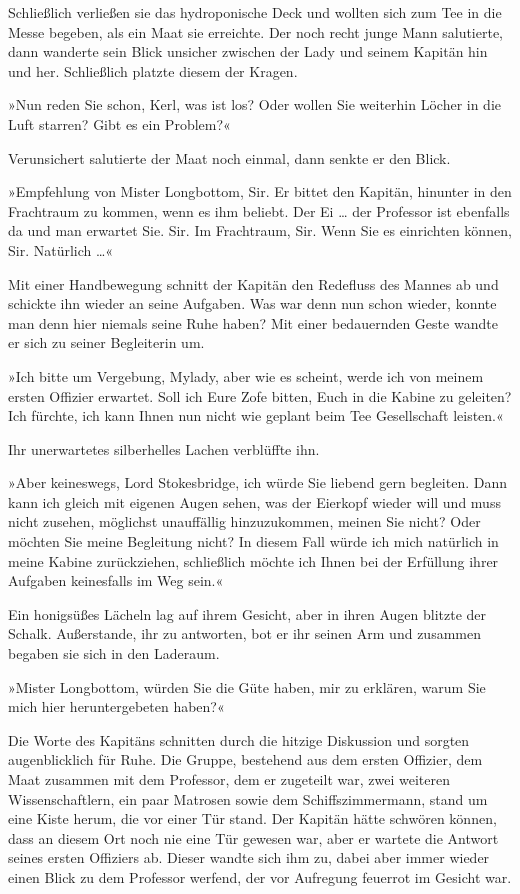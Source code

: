 \bigpar

Schließlich verließen sie das hydroponische Deck und wollten sich
zum Tee in die Messe begeben, als ein Maat sie erreichte. Der noch
recht junge Mann salutierte, dann wanderte sein Blick unsicher
zwischen der Lady und seinem Kapitän hin und her. Schließlich
platzte diesem der Kragen.

»Nun reden Sie schon, Kerl, was ist los? Oder wollen Sie weiterhin
Löcher in die Luft starren? Gibt es ein Problem?«

Verunsichert salutierte der Maat noch einmal, dann senkte er den
Blick.

»Empfehlung von Mister Longbottom, Sir. Er bittet den Kapitän,
hinunter in den Frachtraum zu kommen, wenn es ihm beliebt. Der Ei
\ldots{} der Professor ist ebenfalls da und man erwartet Sie. Sir. Im
Frachtraum, Sir. Wenn Sie es einrichten können, Sir. Natürlich
\ldots{}«

Mit einer Handbewegung schnitt der Kapitän den Redefluss des Mannes
ab und schickte ihn wieder an seine Aufgaben. Was war denn nun
schon wieder, konnte man denn hier niemals seine Ruhe haben? Mit
einer bedauernden Geste wandte er sich zu seiner Begleiterin um.

»Ich bitte um Vergebung, Mylady, aber wie es scheint, werde ich von
meinem ersten Offizier erwartet. Soll ich Eure Zofe bitten, Euch in
die Kabine zu geleiten? Ich fürchte, ich kann Ihnen nun nicht wie
geplant beim Tee Gesellschaft leisten.«

Ihr unerwartetes silberhelles Lachen verblüffte ihn.

»Aber keineswegs, Lord Stokesbridge, ich würde Sie liebend gern
begleiten. Dann kann ich gleich mit eigenen Augen sehen, was der
Eierkopf wieder will und muss nicht zusehen, möglichst unauffällig
hinzuzukommen, meinen Sie nicht? Oder möchten Sie meine Begleitung
nicht? In diesem Fall würde ich mich natürlich in meine Kabine
zurückziehen, schließlich möchte ich Ihnen bei der Erfüllung ihrer
Aufgaben keinesfalls im Weg sein.«

Ein honigsüßes Lächeln lag auf ihrem Gesicht, aber in ihren Augen
blitzte der Schalk. Außerstande, ihr zu antworten, bot er ihr
seinen Arm und zusammen begaben sie sich in den Laderaum.

\bigpar

»Mister Longbottom, würden Sie die Güte haben, mir zu erklären,
warum Sie mich hier heruntergebeten haben?«

Die Worte des Kapitäns schnitten durch die hitzige Diskussion und
sorgten augenblicklich für Ruhe. Die Gruppe, bestehend aus dem
ersten Offizier, dem Maat zusammen mit dem Professor, dem er
zugeteilt war, zwei weiteren Wissenschaftlern, ein paar Matrosen
sowie dem Schiffszimmermann, stand um eine Kiste herum, die vor
einer Tür stand. Der Kapitän hätte schwören können, dass an diesem
Ort noch nie eine Tür gewesen war, aber er wartete die Antwort
seines ersten Offiziers ab. Dieser wandte sich ihm zu, dabei aber
immer wieder einen Blick zu dem Professor werfend, der vor
Aufregung feuerrot im Gesicht war.

